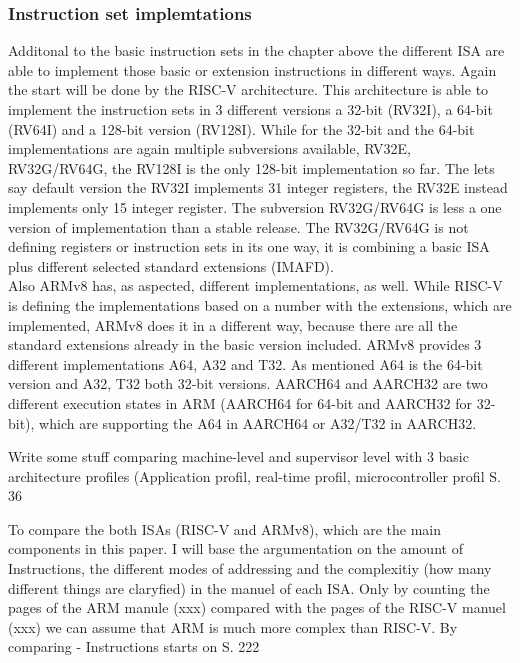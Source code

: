 \documentclass[conference]{IEEEtran}
\begin{document}
\subsubsection{Instruction set implemtations}
Additonal to the basic instruction sets in the chapter above the different \gls{ISA} are able to implement those basic or extension instructions in different ways. Again the start will be done by the RISC-V architecture. This architecture is able to implement the instruction sets in 3 different versions a 32-bit (RV32I), a 64-bit (RV64I) and a 128-bit version (RV128I).
While for the 32-bit and the 64-bit implementations are again multiple subversions available, RV32E, RV32G/RV64G, the RV128I is the only 128-bit implementation so far. The lets say default version the RV32I implements 31 integer registers, the RV32E instead implements only 15 integer register. The subversion RV32G/RV64G is less a one version of implementation than a stable release. The RV32G/RV64G is not defining registers or instruction sets in its one way, it is combining a basic \gls{ISA} plus different selected standard extensions (IMAFD). \cite{Asanovic2016} \\

Also ARMv8 has, as aspected, different implementations, as well. While RISC-V is defining the implementations based on a number with the extensions, which are implemented, ARMv8 does it in a different way, because there are all the standard extensions already in the basic version included.
ARMv8 provides 3 different implementations A64, A32 and T32. As mentioned A64 is the 64-bit version and A32, T32  both 32-bit versions.
AARCH64 and AARCH32 are two different execution states in ARM (AARCH64 for 64-bit and AARCH32 for 32-bit), which are supporting the A64 in AARCH64 or A32/T32 in AARCH32.

Write some stuff comparing machine-level and supervisor level \cite{AndrewWaterman} with 3 basic architecture profiles (Application profil, real-time profil, microcontroller profil\cite{ArmManual} S. 36

	To compare the both \glspl{ISA} (RISC-V and ARMv8), which are the main components in this paper. I will base the argumentation on the amount of Instructions, the different modes of addressing and the complexitiy (how many different things are claryfied) in the manuel of each \gls{ISA}. 
	Only by counting the pages of the ARM manule (xxx) compared with the pages of the RISC-V manuel (xxx) we can assume that ARM is much more complex than RISC-V. By comparing 
	- Instructions starts on \cite{ArmManual} S. 222
\end{document}

